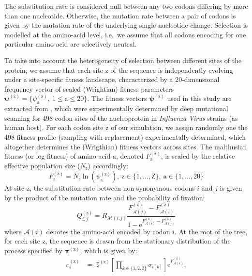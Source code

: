 \documentclass{article}
\newcommand{\UniDimArray}[1]{\bm{#1}}
\newcommand{\e}{\text{e}}
\newcommand{\Ner}{N_{\text{r}}}
\newcommand{\mutmatrix}{R}
\newcommand{\mutequi}{\sigma}
\newcommand{\ci}{{i}}
\newcommand{\cj}{{j}}
\newcommand{\itoj}{\ci, \cj}
\newcommand{\nuc}{\mathcal{M}}
\newcommand{\nucitoj}{\nuc(\itoj)}
\newcommand{\submatrix}{Q}
\newcommand{\subequi}{\pi}
\newcommand{\Subequi}{\UniDimArray{\subequi}}
\newcommand{\aminoacid}{\text{a}}
\newcommand{\SetAa}{\aminoacid \in \{1, \hdots, 20\} }
\newcommand{\aaMap}{\mathcal{A}}
\newcommand{\aai}{\aaMap(\ci)}
\newcommand{\aaj}{\aaMap(\cj)}
\newcommand{\scaledfit}{F}
\newcommand{\Fiti}{\scaledfit_{\aai}}
\newcommand{\Fitj}{\scaledfit_{\aaj}}
\newcommand{\site}{\text{z}}
\newcommand{\Nsite}{\text{Z}}
\newcommand{\siteexp}{^{(\site)}}
\newcommand{\Setsite}{\site \in \{1, \hdots, \Nsite\} }
\newcommand{\profile}{\psi}
\newcommand{\Profile}{\UniDimArray{\profile}}
\begin{document}
The {substitution} rate is considered null between any two codons differing by more than one nucleotide.
Otherwise, the mutation rate between a pair of codons is given by the mutation rate of the underlying single nucleotide change.
Selection is modelled at the amino-acid level, i.e.~we assume that all codons encoding for one particular amino acid are selectively {neutral}.

To take into account the heterogeneity of selection between different sites of the protein, we assume that each site $\site$ of the sequence is independently evolving under a site-specific fitness landscape, characterized by a 20-dimensional frequency vector of scaled (Wrightian) fitness parameters $\Profile\siteexp = \{ \profile\siteexp_{\aminoacid},\ 1 \leq \aminoacid \leq 20 \}$.
The fitness vectors $\Profile\siteexp$ used in this study are extracted from \citet{Bloom2017}, which were experimentally determined by deep mutational scanning for 498 codon sites of the nucleoprotein in \textit{Influenza Virus} strains (as human host).
For each {codon} site $\site$ of our simulation, we assign randomly one the 498 fitness profile (sampling with replacement) experimentally determined, which altogether determines the (Wrigthian) fitness vectors across sites.
The malthusian fitness (or log-fitness) of amino acid $\aminoacid$, denoted $\scaledfit\siteexp_{\aminoacid}$, is scaled by the relative effective population size ($\Ner$) accordingly:
\begin{equation}
 \scaledfit\siteexp_{\aminoacid} = \Ner \ln \left( \profile\siteexp_{\aminoacid} \right),\ \Setsite, \ \SetAa
\end{equation}
At site $\site$, the {substitution} rate between {non-synonymous} codons $\ci$ and $\cj$ is given by the product of the mutation rate and the probability of fixation:
\begin{equation}
 \submatrix_{\itoj}\siteexp = \mutmatrix_{\nucitoj} \dfrac{\Fitj\siteexp - \Fiti\siteexp}{1 - \e^{\Fiti\siteexp - \Fitj\siteexp} } \label{eq:codonsubrates}
\end{equation}
where $\aai$ denotes the amino-acid encoded by codon $\ci$.
At the root of the tree, for each site $\site$, the sequence is drawn from the stationary distribution of the process specified by $\Subequi\siteexp$, which is given by:
\begin{align}
 \subequi_{\ci}\siteexp & = \mathcal{Z}\siteexp \left[\prod\limits_{k \in \{ 1, 2, 3 \}} \mutequi_{\ci[k]}\right] \e^{\Fiti\siteexp},
 \label{codonStationarity}
\end{align}
\end{document}
